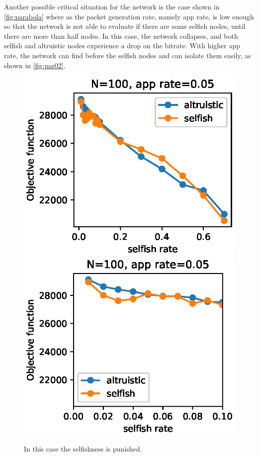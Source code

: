 \documentclass[conference,10.5pt]{IEEEtran}
\begin{document}
Another possible critical situation for the network is the case shown in \autoref{fig:parabola} where as the packet generation rate, namely app rate, is low enough so that the network is not able to evaluate if there are some selfish nodes, until there are more than half nodes. In this case, the network collapses, and both selfish and altruistic nodes experience a drop on the bitrate. With higher app rate, the network can find before the selfish nodes and can isolate them easily, as shown in \autoref{fig:par02}.
\begin{figure}
  \includegraphics{figures/obj_func_vs_selfish_rate_parabola_02.eps}
  \includegraphics{figures/obj_func_vs_selfish_rate_parabola02_zoom.eps}
  \caption{In this case the selfishness is punished.}
  \label{fig:par02}
\end{figure}
\end{document}
